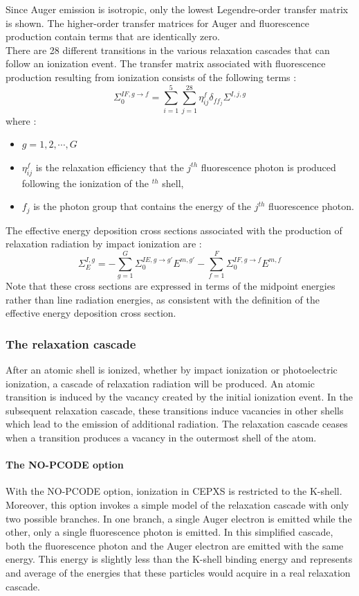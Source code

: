 Since Auger emission is isotropic, only the lowest Legendre-order transfer
matrix is shown. The higher-order transfer matrices for Auger and fluorescence
production contain terms that are identically zero.\\
There are 28 different transitions in the various relaxation cascades that can
follow an ionization event. The transfer matrix associated with fluorescence
production resulting from ionization consists of the following terms :
\begin{equation}
\Sigma_{0}^{IF,g\rightarrow f} = \sum_{i=1}^5 \sum_{j=1}^{28} \eta_{ij}^f
\delta_{ff_j} \Sigma^{I,j,g}
\end{equation}
where :
\begin{itemize}
\item $g=1,2,\cdots,G$
\item $\eta_{ij}^f$ is the relaxation efficiency that the $j^{th}$ fluorescence
photon is produced following the ionization of the $^{th}$ shell,
\item $f_j$ is the photon group that contains the energy of the $j^{th}$
fluorescence photon.
\end{itemize}
The effective energy deposition cross sections associated with the production
of relaxation radiation by impact ionization are :
\begin{equation}
\Sigma_E^{I,g} = - \sum_{g=1}^G \Sigma_0^{IE,g\rightarrow g'}E^{m,g'}
- \sum_{f=1}^F \Sigma_0^{IF,g\rightarrow f} E^{m,f}
\end{equation}
Note that these cross sections are expressed in terms of the midpoint energies
rather than line radiation energies, as consistent with the definition of the
effective energy deposition cross section.

\subsubsection{The relaxation cascade}
After an atomic shell is ionized, whether by impact ionization or
photoelectric ionization, a cascade of relaxation radiation will be produced.
An atomic transition is induced by the vacancy created by the initial
ionization event. In the subsequent relaxation cascade, these transitions
induce vacancies in other shells which lead to the emission of additional 
radiation. The relaxation cascade ceases when a transition produces a vacancy
in the outermost shell of the atom.

\paragraph{The NO-PCODE option}
With the NO-PCODE option, ionization in CEPXS is restricted to the K-shell.
Moreover, this option invokes a simple model of the relaxation cascade with
only two possible branches. In one branch, a single Auger electron is emitted
while the other, only a single fluorescence photon is emitted. In this
simplified cascade, both the fluorescence photon and the Auger electron are
emitted with the same energy. This energy is slightly less than the
K-shell binding energy and represents and average of the energies that these
particles would acquire in a real relaxation cascade.

